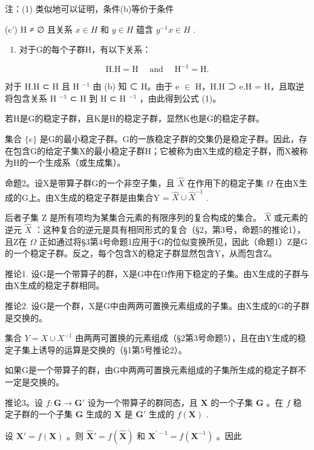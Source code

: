 注：(1) 类似地可以证明，条件(b)等价于条件

(c') H ≠ ∅ 且关系 \(x \in H\) 和 \(y \in H\) 蕴含 \(y^{-1}x \in H\) .

\begin{enumerate}
\def\labelenumi{(\arabic{enumi})}
\setcounter{enumi}{1}
\tightlist
\item
  对于G的每个子群H，有以下关系：
\end{enumerate}

\[
\mathrm{H.H} = \mathrm{H} \quad \text { and } \quad \mathrm{H} ^ {- 1} = \mathrm{H}.\tag{1}
\]

对于 H.H ⊂ H 且 H \(^{-1}\) 由 (b) 知 ⊂ H。由于 e \ensuremath{\in} H，H.H ⊃ e.H = H，且取逆将包含关系 H \(^{-1}\) ⊂ H 到 H ⊂ H \(^{-1}\) ，由此得到公式 (1)。

若H是G的稳定子群，且K是H的稳定子群，显然K也是G的稳定子群。

集合 \(\{e\}\) 是G的最小稳定子群。G的一族稳定子群的交集仍是稳定子群。因此，存在包含G的给定子集X的最小稳定子群H；它被称为由X生成的稳定子群，而X被称为H的一个生成系（或生成集）。

命题2。设X是带算子群G的一个非空子集，且 \(\hat{X}\) 在作用下的稳定子集 \(\Omega\) 在由X生成的G上。由X生成的稳定子群是由集合Y = \(\hat{X} \cup \hat{X}^{-1}\) .

后者子集 Z 是所有项均为某集合元素的有限序列的复合构成的集合。 \(\hat{X}\) 或元素的逆元 \(\hat{X}\) ：这种复合的逆元是具有相同形式的复合（§2，第3号，命题5的推论1），且Z在 \(\Omega\) 正如通过将§3第4号命题1应用于G的位似变换所见，因此（命题1）Z是G的一个稳定子群。反之，每个包含X的稳定子群显然包含Y，从而包含Z。

推论1. 设G是一个带算子的群，X是G中在Ω作用下稳定的子集。由X生成的子群与由X生成的稳定子群相同。

推论2. 设G是一个群，X是G中由两两可置换元素组成的子集。由X生成的G的子群是交换的。

集合 \(Y = X \cup X^{-1}\) 由两两可置换的元素组成（§2第3号命题5），且在由Y生成的稳定子集上诱导的运算是交换的（§1第5号推论2）。

如果G是一个带算子的群，由G中两两可置换元素组成的子集所生成的稳定子群不一定是交换的。

推论3。设 \(f: \mathbf{G} \to \mathbf{G}'\) 设为一个带算子的群同态，且 \(\mathbf{X}\) 的一个子集 \(\mathbf{G}\) 。在 \(f\) 稳定子群的一个子集 \(\mathbf{G}\) 生成的 \(\mathbf{X}\) 是 \(\mathbf{G}'\) 生成的 \(f(\mathbf{X})\) .

设 \(\mathbf{X}' = f(\mathbf{X})\) 。则 \(\hat{\mathbf{X}}' = f(\hat{\mathbf{X}})\) 和 \(\mathbf{X}^{\prime -1} = f(\mathbf{X}^{-1})\) 。因此

